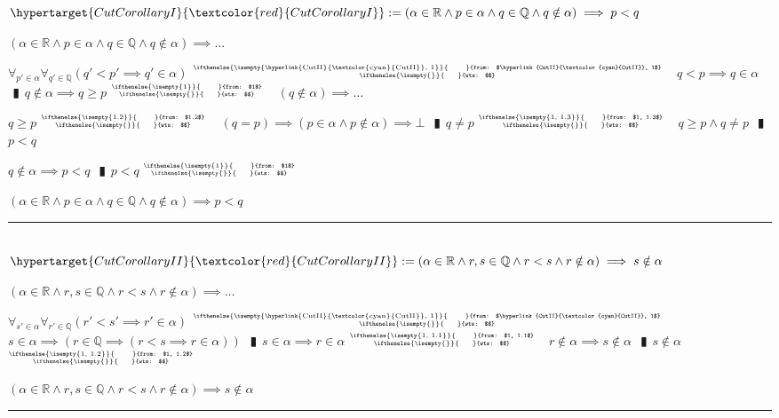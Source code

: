 \documentclass{book}
\newcommand{\df}[1]{\hypertarget{#1}{\textcolor{red}{#1}}}
\newcommand{\rf}[1]{\hyperlink{#1}{\textcolor{cyan}{#1}}}
\newcommand{\abr}{:=}
\newcommand{\pipe}{$\phantom{(}\vrectangleblack\phantom{)}$}
\newcommand{\ann}[2]{%
  \hfill %
  $\stackrel%
  {\hbox{\tiny{\ifthenelse{\isempty{#1}}%
    {\phantom{from}}%
    {from: $#1$}}}}%
  {\hbox{\tiny{\ifthenelse{\isempty{#2}}%
    {\phantom{wts}}%
    {wts: $#2$}}}}$%
\ }
\begin{document}
$\df{CutCorollaryI} \abr (\alpha \in \mathbb{R} \land p \in \alpha \land q \in \mathbb{Q} \land q \notin \alpha) \implies p < q$
\begin{enumerate}
  \lit $(\alpha \in \mathbb{R} \land p \in \alpha \land q \in \mathbb{Q} \land q \notin \alpha) \implies \ldots$
  \begin{enumerate}
    \lit $\forall_{p' \in \alpha} \forall_{q' \in \mathbb{Q}}(q' < p' \implies q' \in \alpha)$    \ann{\rf{CutII}, 1}{}
    \lit $q < p \implies q \in \alpha$ \pipe $q \notin \alpha \implies q \geq p$    \ann{1}{}
    \lit $(q \notin \alpha) \implies \ldots$
    \begin{enumerate}
      \lit $q \geq p$    \ann{1.2}{}
      \lit $(q = p) \implies (p \in \alpha \land p \notin \alpha) \implies \bot$ \pipe $q \neq p$    \ann{1, 1.3}{}
      \lit $q \geq p \land q \neq p$ \pipe $p < q$
    \end{enumerate}
    \lit $q \notin \alpha \implies p < q$ \pipe $p < q$    \ann{1}{}
  \end{enumerate}
  \lit $(\alpha \in \mathbb{R} \land p \in \alpha \land q \in \mathbb{Q} \land q \notin \alpha) \implies p < q$
\end{enumerate} \vspace{.75mm} \hrule \vspace{.75mm} \ \\

$\df{CutCorollaryII} \abr (\alpha \in \mathbb{R} \land r, s \in \mathbb{Q} \land r < s \land r \notin \alpha) \implies s \notin \alpha$
\begin{enumerate}
  \lit $(\alpha \in \mathbb{R} \land r, s \in \mathbb{Q} \land r < s \land r \notin \alpha) \implies \ldots$
  \begin{enumerate}
    \lit $\forall_{s' \in \alpha} \forall_{r' \in \mathbb{Q}}(r' < s' \implies r' \in \alpha)$    \ann{\rf{CutII}, 1}{}
    \lit $s \in \alpha \implies (r \in \mathbb{Q} \implies (r < s \implies r \in \alpha))$ \pipe $s \in \alpha \implies r \in \alpha$    \ann{1, 1.1}{}
    \lit $r \notin \alpha \implies s \notin \alpha$ \pipe $s \notin \alpha$    \ann{1, 1.2}{}
  \end{enumerate}
  \lit $(\alpha \in \mathbb{R} \land r, s \in \mathbb{Q} \land r < s \land r \notin \alpha) \implies s \notin \alpha$
\end{enumerate} \vspace{.75mm} \hrule \vspace{.75mm} \ \\
\end{document}
